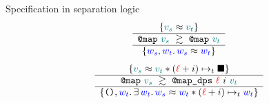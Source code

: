 \begin{frame}{Specification in separation logic}
\Large
\[
    \iSimvHoarePretty{
        \mathcolor{teal}{\datalangVal_s} \iSimilar \mathcolor{teal}{\datalangVal_t}
    }{
        \datalangCall{\datalangFnptr{\texttt{map}}}{\mathcolor{teal}{\datalangVal_s}}
    }{
        \datalangCall{\datalangFnptr{\texttt{map}}}{\mathcolor{teal}{\datalangVal_t}}
    }{
        \mathcolor{blue}{\datalangValTwo_s}, \mathcolor{blue}{\datalangValTwo_t} \ldotp
        \mathcolor{blue}{\datalangValTwo_s} \iSimilar \mathcolor{blue}{\datalangValTwo_t}
    }
\]
\vfill
\[
    \iSimvHoarePretty{
        \mathcolor{teal}{\datalangVal_s} \iSimilar \mathcolor{teal}{\datalangVal_t} \iSep
        (\mathcolor{red}{\datalangLoc} + \datalangIdx) \iPointsto_t \datalangHole
    }{
        \datalangCall{\datalangFnptr{\texttt{map}}}{\mathcolor{teal}{\datalangVal_s}}
    }{
        \datalangCall{\datalangFnptr{\texttt{map\_dps}}}{\mathcolor{red}{\datalangLoc}\ \datalangIdx\ \mathcolor{teal}{\datalangVal_t}}
    }{
        \datalangUnit, \mathcolor{blue}{\datalangValTwo_t} \ldotp
            \exists \mathcolor{blue}{\datalangValTwo_t} \ldotp
            \mathcolor{blue}{\datalangValTwo_s} \iSimilar \mathcolor{blue}{\datalangValTwo_t} \iSep
            (\mathcolor{red}{\datalangLoc} + \datalangIdx) \iPointsto_t \mathcolor{blue}{\datalangValTwo_t}
    }
\]
\end{frame}

